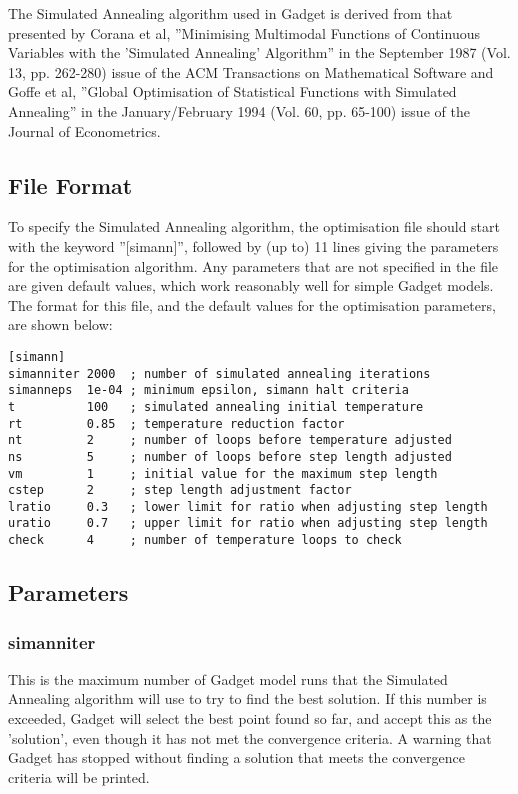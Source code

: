\documentclass[10pt,twoside]{book}
\begin{document}
\bigskip
The Simulated Annealing algorithm used in Gadget is derived from that presented by Corana et al, ''Minimising Multimodal Functions of Continuous Variables with the 'Simulated Annealing' Algorithm'' in the September 1987 (Vol. 13, pp. 262-280) issue of the ACM Transactions on Mathematical Software and Goffe et al, ''Global Optimisation of Statistical Functions with Simulated Annealing'' in the January/February 1994 (Vol. 60, pp. 65-100) issue of the Journal of Econometrics.

\subsection{File Format}\label{subsec:simannfile}
To specify the Simulated Annealing algorithm, the optimisation file should start with the keyword ''[simann]'', followed by (up to) 11 lines giving the parameters for the optimisation algorithm.  Any parameters that are not specified in the file are given default values, which work reasonably well for simple Gadget models.  The format for this file, and the default values for the optimisation parameters, are shown below:

{\small\begin{verbatim}
[simann]
simanniter 2000  ; number of simulated annealing iterations
simanneps  1e-04 ; minimum epsilon, simann halt criteria
t          100   ; simulated annealing initial temperature
rt         0.85  ; temperature reduction factor
nt         2     ; number of loops before temperature adjusted
ns         5     ; number of loops before step length adjusted
vm         1     ; initial value for the maximum step length
cstep      2     ; step length adjustment factor
lratio     0.3   ; lower limit for ratio when adjusting step length
uratio     0.7   ; upper limit for ratio when adjusting step length
check      4     ; number of temperature loops to check
\end{verbatim}}

\subsection{Parameters}\label{subsec:simannpar}
\subsubsection{simanniter}
This is the maximum number of Gadget model runs that the Simulated Annealing algorithm will use to try to find the best solution.  If this number is exceeded, Gadget will select the best point found so far, and accept this as the 'solution', even though it has not met the convergence criteria.  A warning that Gadget has stopped without finding a solution that meets the convergence criteria will be printed.
\end{document}
